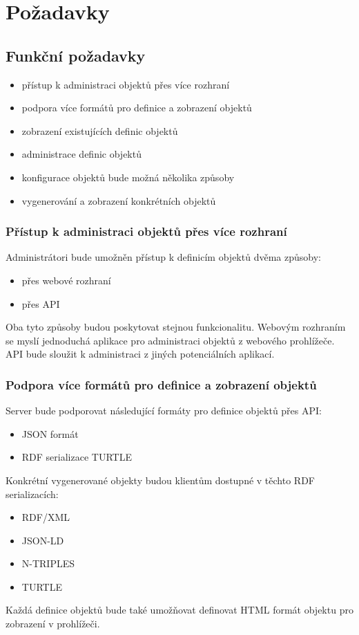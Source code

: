 \documentclass[thesis=B,czech]{FITthesis}[2012/06/26]
\begin{document}
 

\section{Požadavky}

\subsection{Funkční požadavky}
 \begin{itemize}
  \item přístup k administraci objektů přes více rozhraní
  \item podpora více formátů pro definice a zobrazení objektů
  \item zobrazení existujících definic objektů
  \item administrace definic objektů  
  \item konfigurace objektů bude možná několika způsoby
  \item vygenerování a zobrazení konkrétních objektů
 \end{itemize}
 
 \subsubsection{Přístup k administraci objektů přes více rozhraní}
 Administrátori bude umožněn přístup k definicím objektů dvěma způsoby:
 \begin{itemize}
    \item přes webové rozhraní
    \item přes API
 \end{itemize}
 Oba tyto způsoby budou poskytovat stejnou funkcionalitu. Webovým rozhraním se myslí jednoduchá aplikace pro administraci objektů z webového prohlížeče.
 API bude sloužit k administraci z jiných potenciálních aplikací.
 
 \subsubsection{Podpora více formátů pro definice a zobrazení objektů}
 Server bude podporovat následující formáty pro definice objektů přes API:
 \begin{itemize}
    \item JSON formát
    \item RDF serializace TURTLE \cite{turtle_example}
 \end{itemize}
 Konkrétní vygenerované objekty budou klientům dostupné v těchto RDF serializacích:
 \begin{itemize}
    \item RDF/XML \cite{rdf_xml}
    \item JSON-LD \cite{rdf_json_ld}
    \item N-TRIPLES \cite{rdf_n_triples}
    \item TURTLE 
 \end{itemize}
 Každá definice objektů bude také umožňovat definovat HTML formát objektu pro zobrazení v prohlížeči.
 
\end{document}
